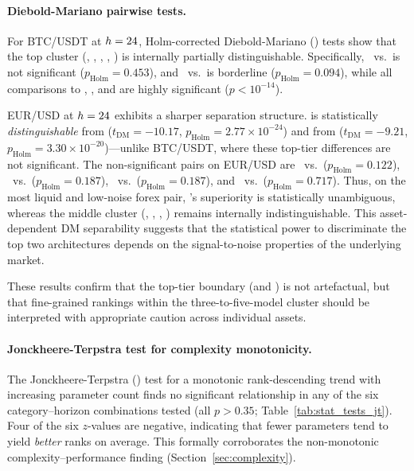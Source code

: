 \paragraph{Diebold-Mariano pairwise tests.}
For BTC/USDT at $h=24$, Holm-corrected Diebold-Mariano (\dm) tests show that the top cluster (\moderntcn, \patchtst, \timexer, \dlinear, \itransformer) is internally partially distinguishable.  Specifically, \moderntcn~vs.~\patchtst is not significant ($p_\text{Holm} = 0.453$), and \moderntcn~vs.~\timexer is borderline ($p_\text{Holm} = 0.094$), while all comparisons to \lstm, \autoformer, and \timesnet are highly significant ($p < 10^{-14}$).

EUR/USD at $h=24$ exhibits a sharper separation structure.  \moderntcn is statistically \emph{distinguishable} from \patchtst ($t_\text{DM} = -10.17$, $p_\text{Holm} = 2.77 \times 10^{-24}$) and from \timexer ($t_\text{DM} = -9.21$, $p_\text{Holm} = 3.30 \times 10^{-20}$)---unlike BTC/USDT, where these top-tier differences are not significant.  The non-significant pairs on EUR/USD are \dlinear~vs.~\patchtst ($p_\text{Holm} = 0.122$), \dlinear~vs.~\timexer ($p_\text{Holm} = 0.187$), \dlinear~vs.~\itransformer ($p_\text{Holm} = 0.187$), and \itransformer~vs.~\patchtst ($p_\text{Holm} = 0.717$).  Thus, on the most liquid and low-noise forex pair, \moderntcn's superiority is statistically unambiguous, whereas the middle cluster (\dlinear, \itransformer, \patchtst, \timexer) remains internally indistinguishable.  This asset-dependent DM separability suggests that the statistical power to discriminate the top two architectures depends on the signal-to-noise properties of the underlying market.

These results confirm that the top-tier boundary (\moderntcn and \patchtst) is not artefactual, but that fine-grained rankings within the three-to-five-model cluster should be interpreted with appropriate caution across individual assets.

\paragraph{Jonckheere-Terpstra test for complexity monotonicity.}
The Jonckheere-Terpstra (\jt) test for a monotonic rank-descending trend with increasing parameter count finds no significant relationship in any of the six category--horizon combinations tested (all $p > 0.35$; Table~\ref{tab:stat_tests_jt}).  Four of the six $z$-values are negative, indicating that fewer parameters tend to yield \emph{better} ranks on average.  This formally corroborates the non-monotonic complexity--performance finding (Section~\ref{sec:complexity}).

